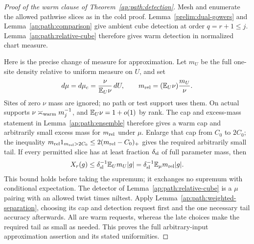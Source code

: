 \begin{proof}[Proof of the warm clause of Theorem~\ref{ap:path:detection}]
Mesh and enumerate the allowed pathwise slices as in the cold
proof. Lemma~\ref{prelim:dual-gowers} and
Lemma~\ref{ap:path:comparison} give ambient cube detection at
order $q=r+1\le j$. Lemma~\ref{ap:path:relative-cube} therefore
gives warm detection in normalized chart measure.

Here is the precise change of measure for approximation.  Let
$m_U$ be the full one-site density relative to uniform measure
on $U$, and set
\[
 d\mu=d\mu_c=\frac{\nu}{\mathbb E_U\nu}\,dU,
 \qquad m_{\rm rel}=(\mathbb E_U\nu)\frac{m_U}{\nu}.
\]
Sites of zero $\nu$ mass are ignored; no path or test support
uses them.  On actual supports $\nu\asymp_{\rm warm}m_j^{-1}$,
and $\mathbb E_U\nu=1+o(1)$ by rank.  The cap and excess-mass
statement in Lemma~\ref{ap:path:ensemble} therefore gives a
warm cap and arbitrarily small excess mass for $m_{\rm rel}$ under
$\mu$.  Enlarge that cap from $C_0$ to $2C_0$; the inequality
$m_{\rm rel}1_{m_{\rm rel}>2C_0}
 \le2(m_{\rm rel}-C_0)_+$ gives the required arbitrarily small
tail.  If every permitted slice has at least fraction
$\delta_{\rm sl}$ of full parameter mass, then
\[
 X_r(g)\le\delta_{\rm sl}^{-1}\mathbb E_U m_U|g|
       =\delta_{\rm sl}^{-1}\mathbb E_\mu m_{\rm rel}|g|.
\]
This bound holds before taking the supremum; it exchanges no
supremum with conditional expectation.  The detector of
Lemma~\ref{ap:path:relative-cube} is a $\mu$ pairing with an
allowed twist times niltest.  Apply
Lemma~\ref{ap:path:weighted-separation}, choosing its cap and
detection request first and the one necessary tail accuracy
afterwards.  All are warm requests, whereas the late choices
make the required tail as small as needed.  This proves the
full arbitrary-input approximation assertion and its stated
uniformities.
\end{proof}


